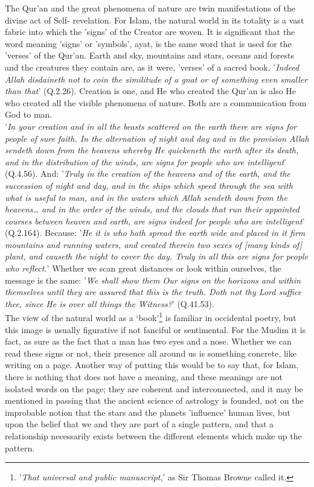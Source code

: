 \documentclass[10pt, twoside,openright]{book}
\begin{document}
The Qur'an and the great phenomena of nature are twin manifestations of the divine act of Self\hyp{}
revelation. For Islam, the natural world in its totality is a vast fabric into which the 'signs' of 
the Creator are woven. It is significant that the word meaning 'signs' or 'symbols', ayat, is the 
same word that is used for the 'verses' of the Qur'an. Earth and sky, mountains and stars, oceans and 
forests and the creatures they contain are, as it were, 'verses' of a sacred book. '\emph{Indeed Allah 
disdaineth not to coin the similitude of a gnat or of something even smaller than that}' (Q.2.26). 
Creation is one, and He who created the Qur'an is also He who created all the visible phenomena of 
nature. Both are a communication from God to man. \\

'\emph{In your creation and in all the beasts scattered on the earth there are signs for people of sure 
faith. In the alternation of night and day and in the provision Allah sendeth down from the heavens 
whereby He quickeneth the earth after its death, and in the distribution of the winds, are signs for 
people who are intelligent}' (Q.4.56). And: '\emph{Truly in the creation of the heavens and of the earth, 
and the succession of night and day, and in the ships which speed through the sea with what is useful 
to man, and in the waters which Allah sendeth down from the heavens\ldots{} and in the order of the 
winds, and the clouds that run their appointed courses between heaven and earth, are signs indeed for 
people who are intelligent}' (Q.2.164). Because: '\emph{He it is who hath spread the earth wide and placed in it firm mountains and running waters, and created therein two sexes of [many kinds of] plant, and causeth the night to cover the day. Truly in all this are signs for people who reflect.}' Whether we 
scan great distances or look within ourselves, the message is the same: '\emph{We shall show them Our signs on the horizons and within themselves until they are assured that this is the truth. Doth not thy 
Lord suffice thee, since He is over all things the Witness?}' (Q.41.53). \\

The view of the natural world as a `book'\footnote{'\emph{That universal and public manuscript},' as Sir Thomas Browne called it.} is familiar in occidental poetry, but this image is usually figurative if not fanciful or sentimental. For the Muslim it is fact, as sure as the fact that a man has two eyes and a nose. Whether we can read these signs or not, their presence all around us is something concrete, like writing on a page. Another way of putting this would be to say that, for Islam, there is nothing that does not have a meaning, and these meanings are not isolated words on the page; they are coherent and interconnected, and it may be mentioned in passing that the ancient science of astrology is founded, not on the improbable notion that the stars and the planets 'influence' human lives, but upon the belief that we and they are part of a single pattern, and that a relationship necessarily exists between the different elements which make up the pattern. \\
\end{document}
